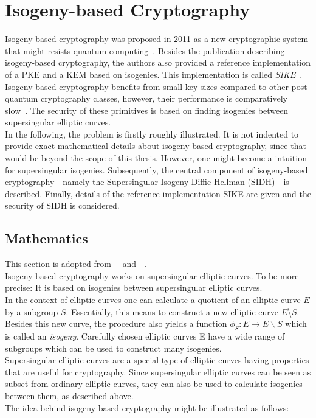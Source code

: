 \section{Isogeny-based Cryptography} \label{sec:isogeny-based_crypto}
Isogeny-based cryptography was proposed in 2011 as a new cryptographic system that might resists quantum computing~\parencite{jao2011towards}. Besides the publication describing isogeny-based cryptography, the authors also provided a reference implementation of a \gls{PKE} and a \gls{KEM} based on isogenies. This implementation is called \textit{\gls{SIKE}}~\parencite{sike2020spec}. Isogeny-based cryptography benefits from small key sizes compared to other post-quantum cryptography classes, however, their performance is comparatively slow~\parencite{sike2020spec}. The security of these primitives is based on finding isogenies between supersingular elliptic curves.\\
In the following, the problem is firstly roughly illustrated. It is not indented to provide exact mathematical details about isogeny-based cryptography, since that would be beyond the scope of this thesis. However, one might become a intuition for supersingular isogenies. Subsequently, the central component of isogeny-based cryptography - namely the Supersingular Isogeny Diffie-Hellman (\gls{SIDH}) - is described. Finally, details of the reference implementation \gls{SIKE} are given and the security of \gls{SIDH} is considered.

\subsection{Mathematics}
This section is adopted from~~\parencite{urbanik2017friendly} and~~\parencite{costello2019supersingular}.\\
Isogeny-based cryptography works on supersingular elliptic curves. To be more precise: It is based on isogenies between supersingular elliptic curves.
\\
In the context of elliptic curves one can calculate a quotient of an elliptic curve $E$ by a subgroup $S$. Essentially, this means to construct a new elliptic curve $E$\textbackslash $S$.
Besides this new curve, the procedure also yields a function $\phi_S: E \to E \backslash S$ which is called an \textit{isogeny}. Carefully chosen elliptic curves E have a wide range of subgroups which can be used to construct many isogenies.
\\
Supersingular elliptic curves are a special type of elliptic curves having properties that are useful for cryptography. Since supersingular elliptic curves can be seen as subset from ordinary elliptic curves, they can also be used to calculate isogenies between them, as described above.
\\
The idea behind isogeny-based cryptography might be illustrated as follows:

